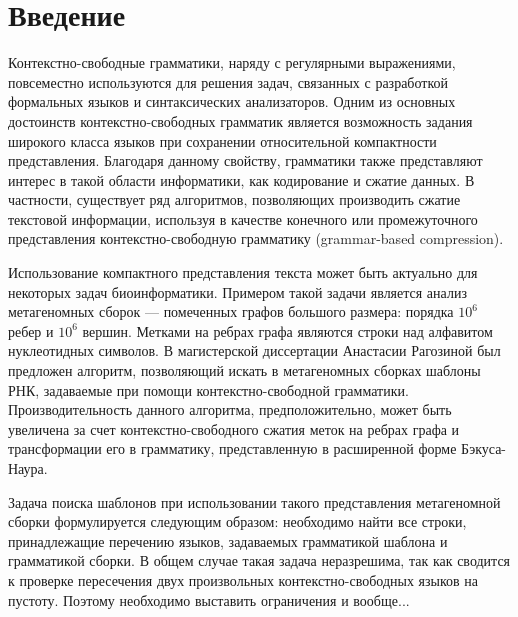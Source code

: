 \section*{Введение}

Контекстно-свободные грамматики, наряду с регулярными выражениями, повсеместно используются для решения задач, связанных с разработкой формальных языков и синтаксических анализаторов. 
Одним из основных достоинств контекстно-свободных грамматик является возможность задания широкого класса языков при сохранении относительной компактности представления. 
Благодаря данному свойству, грамматики также представляют интерес в такой области информатики, как кодирование и сжатие данных. 
В частности, существует ряд алгоритмов, позволяющих производить сжатие текстовой информации, используя в качестве конечного \cite{Sequitur} или промежуточного \cite{Arimura} представления контекстно-свободную грамматику (grammar-based compression).

Использование компактного представления текста может быть актуально для некоторых задач биоинформатики. 
Примером такой задачи является анализ метагеномных сборок --- помеченных графов большого размера: порядка $10^6$ ребер и $10^6$ вершин. 
Метками на ребрах графа являются строки над алфавитом нуклеотидных символов. 
В магистерской диссертации Анастасии Рагозиной \cite{Nastya} был предложен алгоритм, позволяющий искать в метагеномных сборках шаблоны РНК, задаваемые при помощи контекстно-свободной грамматики.
 Производительность данного алгоритма, предположительно, может быть увеличена за счет контекстно-свободного сжатия меток на ребрах графа и трансформации его в грамматику, представленную в расширенной форме Бэкуса-Наура.

Задача поиска шаблонов при использовании такого представления метагеномной сборки формулируется следующим образом: необходимо найти все строки, принадлежащие перечению языков, задаваемых грамматикой шаблона и грамматикой сборки. 
В общем случае такая задача неразрешима, так как сводится к проверке пересечения двух произвольных контекстно-свободных языков на пустоту. Поэтому необходимо выставить ограничения и вообще...